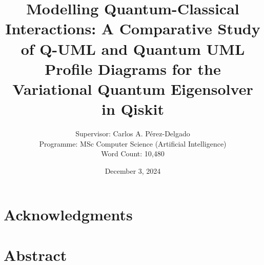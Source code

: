 \documentclass{article}
\title{Modelling Quantum-Classical Interactions: A Comparative Study of Q-UML and Quantum UML Profile Diagrams for the Variational Quantum Eigensolver in Qiskit}
\author{Supervisor: Carlos A. Pérez-Delgado\\ Programme: MSc Computer Science (Artificial Intelligence) \\ Word Count: 10,480}
\date{December 3, 2024}
\begin{document}
\maketitle

\thispagestyle{empty} %

\newpage
\setcounter{page}{1}

\section*{Acknowledgments}
\newpage

\section*{Abstract}
\newpage

\listoffigures
\newpage

\listoftables
\newpage

\end{document}
